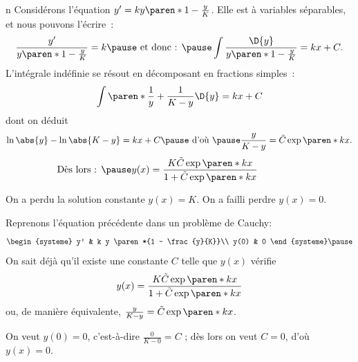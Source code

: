 \begin{frame}
  \begin{example}n
    Considérons l'équation \(y' = k y \paren*{1 - \frac{y}{K}}\).\pause{} Elle est à variables séparables\pause{}, et nous pouvons l'écrire~:
    \begin{equation*}
      \frac{y'}{y\paren*{1-\frac{y}{K}}} = k
      \pause \text{ et donc : }\pause
      \int \frac{\D{y}}{y\paren*{1-\frac{y}{K}}} = k x + C.
    \end{equation*}\pause{}
    L'intégrale indéfinie se résout en décomposant en fractions simples~:\pause{}
    \begin{equation*}
      \int \paren*{\frac{1}{y} + \frac{1}{K-y}} \D{y} = k x + C
    \end{equation*}\pause{}
    dont on déduit\pause{}
    \begin{equation*}
      \ln\abs{y} - \ln{\abs{K-y}} = k x + C\pause
     \text{ d'où }\pause\frac y{K-y} = \tilde{C} \exp{\paren*{kx}}.
   \end{equation*}\pause{}
    \begin{equation*}
\llap{\text{Dès lors~: }}\pause
      y(x) = \frac{K \tilde{C} \exp{\paren*{kx}}}{1 + \tilde{C} \exp{\paren*{kx}}}
    \end{equation*}
  \end{example}
  \begin{remark*}\pause{}
    On a \og perdu\fg{} la solution constante \(y(x) = K\).\pause{} On a failli perdre \(y(x) = 0\).
  \end{remark*}
  \end{frame}
\begin{frame}
  \begin{example}
    Reprenons l'équation précédente dans un problème de Cauchy:\pause{}
    \begin{equation*}
      \begin{systeme}
        y' & k y \paren*{1 - \frac{y}{K}}\\
        y(0) & 0
      \end{systeme}\pause
    \end{equation*}
    On sait déjà qu'il existe une constante \(C\)\pause{} telle que \(y(x)\) vérifie
    \begin{equation*}
      y(x) = \frac{K \tilde{C} \exp{\paren*{kx}}}{1 + \tilde{C} \exp{\paren*{kx}}}
    \end{equation*}
    ou, de manière équivalente, \(\frac y{K-y} = \tilde{C} \exp{\paren*{kx}}\).
    
    On veut \(y(0) = 0\),\pause{} c'est-à-dire \(\frac{0}{K-0} = C\)\pause{} ; dès lors on veut \(C = 0\),\pause{} d'où \(y(x) = 0\).
  \end{example}
\end{frame}
